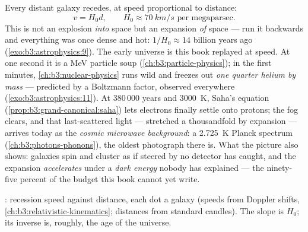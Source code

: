\begin{definition}\label{def:b3:astrophysics:hubble}
Every distant galaxy recedes, at speed proportional to distance:
\[
v = H_0d , \qquad H_0 \approx \qty{70}{km/s}
\text{ per megaparsec} .
\]
This is not an explosion \emph{into} space but an expansion
\emph{of} space --- run it backwards and everything was once
dense and hot: $1/H_0 \approx 14$ billion years ago
(\cref{exo:b3:astrophysics:9}). The early universe is this book
replayed at speed. At one second it is a \unit{MeV} particle soup
(\cref{ch:b3:particle-physics}); in the first minutes,
\cref{ch:b3:nuclear-physics} runs wild and freezes out
\emph{one quarter helium by mass} --- predicted by a Boltzmann
factor, observed everywhere
(\cref{exo:b3:astrophysics:11}). At 380\,000 years and
\qty{3000}{K}, Saha's equation
(\cref{prop:b3:grand-canonical:saha}) lets electrons finally settle
onto protons; the fog clears, and that last-scattered light ---
stretched a thousandfold by expansion --- arrives today as the
\emph{cosmic microwave background}: a \qty{2.725}{K} Planck
spectrum (\cref{ch:b3:photons-phonons}), the oldest photograph
there is. What the picture also shows: galaxies spin and cluster
as if steered by \emph{} no detector has caught, and
the expansion \emph{accelerates} under a \emph{dark energy}
nobody has explained --- the ninety-five percent of the budget
this book cannot yet write.
\end{definition}

\begin{omfigure}

{\small {}: recession speed against distance, each dot
a galaxy (speeds from Doppler shifts,
\cref{ch:b3:relativistic-kinematics}; distances from standard
candles). The slope is $H_0$; its inverse is, roughly, the age
of the universe.}
\end{omfigure}

